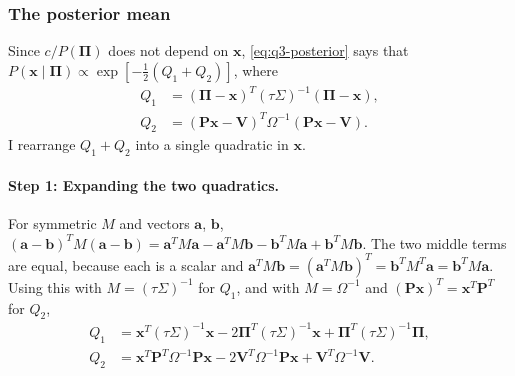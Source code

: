 \documentclass[11pt]{article}
\numberwithin{equation}{section}
\begin{document}
\subsubsection{The posterior mean}
\label{sec:q3-2-2}

Since $c/P(\bm{\Pi})$ does not depend on $\bm{x}$, \eqref{eq:q3-posterior} says that $P\left(\bm{x} \mid \bm{\Pi}\right) \propto \exp\left[-\frac{1}{2}\left(Q_{1} + Q_{2}\right)\right]$, where
\begin{align*}
  Q_{1} &= \left(\bm{\Pi} - \bm{x}\right)^{T}(\tau\Sigma)^{-1}\left(\bm{\Pi} - \bm{x}\right), \\
  Q_{2} &= \left(\bm{P}\bm{x} - \bm{V}\right)^{T}\Omega^{-1}\left(\bm{P}\bm{x} - \bm{V}\right).
\end{align*}
I rearrange $Q_{1} + Q_{2}$ into a single quadratic in $\bm{x}$.

\paragraph{Step 1: Expanding the two quadratics.}
For symmetric $M$ and vectors $\bm{a}$, $\bm{b}$, $(\bm{a} - \bm{b})^{T}M(\bm{a} - \bm{b}) = \bm{a}^{T}M\bm{a} - \bm{a}^{T}M\bm{b} - \bm{b}^{T}M\bm{a} + \bm{b}^{T}M\bm{b}$. The two middle terms are equal, because each is a scalar and $\bm{a}^{T}M\bm{b} = (\bm{a}^{T}M\bm{b})^{T} = \bm{b}^{T}M^{T}\bm{a} = \bm{b}^{T}M\bm{a}$. Using this with $M = (\tau\Sigma)^{-1}$ for $Q_{1}$, and with $M = \Omega^{-1}$ and $(\bm{P}\bm{x})^{T} = \bm{x}^{T}\bm{P}^{T}$ for $Q_{2}$,
\begin{align*}
  Q_{1} &= \bm{x}^{T}(\tau\Sigma)^{-1}\bm{x} - 2\bm{\Pi}^{T}(\tau\Sigma)^{-1}\bm{x} + \bm{\Pi}^{T}(\tau\Sigma)^{-1}\bm{\Pi}, \\
  Q_{2} &= \bm{x}^{T}\bm{P}^{T}\Omega^{-1}\bm{P}\bm{x} - 2\bm{V}^{T}\Omega^{-1}\bm{P}\bm{x} + \bm{V}^{T}\Omega^{-1}\bm{V}.
\end{align*}
\end{document}
